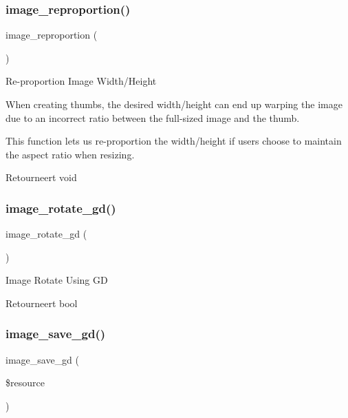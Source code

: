 \subsubsection{\texorpdfstring{image\_reproportion()}{image\_reproportion()}}
{\footnotesize\ttfamily image\+\_\+reproportion (\begin{DoxyParamCaption}{ }\end{DoxyParamCaption})}

Re-\/proportion Image Width/\+Height

When creating thumbs, the desired width/height can end up warping the image due to an incorrect ratio between the full-\/sized image and the thumb.

This function lets us re-\/proportion the width/height if users choose to maintain the aspect ratio when resizing.

\begin{DoxyReturn}{Retourneert}
void 
\end{DoxyReturn}
\mbox{\label{class_c_i___image__lib_ae0d52ef7503342a0a1c56c99da140446}} 
\subsubsection{\texorpdfstring{image\_rotate\_gd()}{image\_rotate\_gd()}}
{\footnotesize\ttfamily image\+\_\+rotate\+\_\+gd (\begin{DoxyParamCaption}{ }\end{DoxyParamCaption})}

Image Rotate Using GD

\begin{DoxyReturn}{Retourneert}
bool 
\end{DoxyReturn}
\mbox{\label{class_c_i___image__lib_a802a33d51249d4d31d59cbc89fbc4dd5}} 
\subsubsection{\texorpdfstring{image\_save\_gd()}{image\_save\_gd()}}
{\footnotesize\ttfamily image\+\_\+save\+\_\+gd (\begin{DoxyParamCaption}\item[{}]{\$resource }\end{DoxyParamCaption})}

